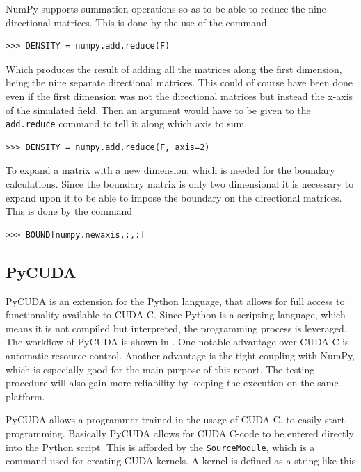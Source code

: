 NumPy supports summation operations so as to be able to reduce the nine directional matrices. This is done by the use of the command

\begin{verbatim}
>>> DENSITY = numpy.add.reduce(F)
\end{verbatim}

Which produces the result of adding all the matrices along the first dimension, being the nine separate directional matrices. This could of course have been done even if the first dimension was not the directional matrices but instead the x-axis of the simulated field. Then an argument would have to be given to the \texttt{add.reduce} command to tell it along which axis to sum.

\begin{verbatim}
>>> DENSITY = numpy.add.reduce(F, axis=2)
\end{verbatim}

To expand a matrix with a new dimension, which is needed for the boundary calculations. Since the boundary matrix is only two dimensional it is necessary to expand upon it to be able to impose the boundary on the directional matrices. This is done by the command

\begin{verbatim}
>>> BOUND[numpy.newaxis,:,:]
\end{verbatim}



\subsection{PyCUDA}
PyCUDA is an extension for the Python language, that allows for full access to functionality available to CUDA C. Since Python is a scripting language, which means it is not compiled but interpreted, the programming process is leveraged. The workflow of PyCUDA is shown in . One notable advantage over CUDA C is automatic resource control. Another advantage is the tight coupling with NumPy, which is especially good for the main purpose of this report. The testing procedure will also gain more reliability by keeping the execution on the same platform.


PyCUDA allows a programmer trained in the usage of CUDA C, to easily start programming. Basically PyCUDA allows for CUDA C-code to be entered directly into the Python script. This is afforded by the \texttt{SourceModule}, which is a command used for creating CUDA-kernels. A kernel is defined as a string like this

